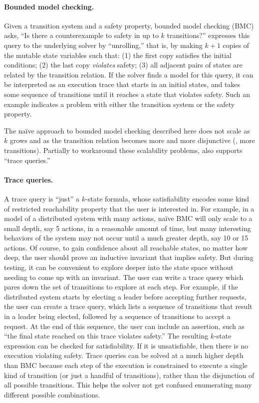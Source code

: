 \paragraph{Bounded model checking.}
Given a transition system and a safety property,
  bounded model checking (BMC) asks,
  ``Is there a counterexample to safety in up to $k$ transitions?''
\mypyvy expresses this query to the underlying solver by ``unrolling,''
  that is, by making $k+1$ copies of the mutable state variables such that:
  (1) the first copy satisfies the initial conditions;
  (2) the last copy \emph{violates} safety;
  (3) all adjacent pairs of states are related by the transition relation.
If the solver finds a model for this query,
  it can be interpreted as an execution trace
  that starts in an initial states, and takes some sequence of transitions
  until it reaches a state that violates safety.
Such an example indicates a problem with
  either the transition system or the safety property.

The na\"{i}ve approach to bounded model checking described here does not scale
  as $k$ grows and as the transition relation becomes more and more disjunctive (\ie, more transitions).
Partially to workaround these scalability problems,
  \mypyvy also supports ``trace queries.''

\paragraph{Trace queries.}
A trace query is ``just'' a $k$-state formula,
  whose satisfiability encodes some kind of restricted reachability property
  that the user is interested in.
For example, in a model of a distributed system with many actions,
  na\"{i}ve BMC will only scale to a small depth, say 5 actions,
  in a reasonable amount of time,
  but many interesting behaviors of the system may not occur until a much greater depth,
  say 10 or 15 actions.
Of course, to gain confidence about all reachable states, no matter how deep,
  the user should prove an inductive invariant that implies safety.
But during testing, it can be convenient to explore deeper into the state space
  without needing to come up with an invariant.
The user can write a trace query which pares down the set of transitions
  to explore at each step.
For example, if the distributed system starts by electing a leader
  before accepting further requests,
  the user can create a trace query,
  which lists a sequence of transitions
  that result in a leader being elected,
  followed by a sequence of transitions to accept a request.
At the end of this sequence, the user can include an assertion,
  such as ``the final state reached on this trace violates safety.''
The resulting $k$-state expression can be checked for satisfiability.
If it is unsatisfiable, then there is no execution violating safety.
Trace queries can be solved at a much higher depth than BMC
  because each step of the execution is constrained to execute
  a single kind of transition (or just a handful of transitions),
  rather than the disjunction of all possible transitions.
This helps the solver not get confused
  enumerating many different possible combinations.

